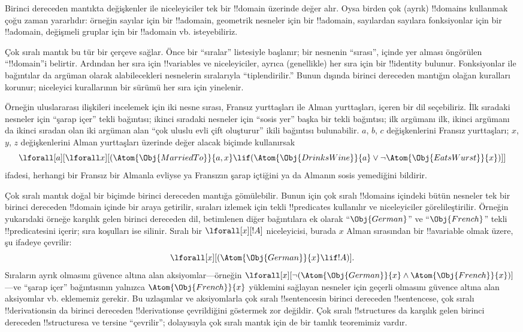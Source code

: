 \documentclass[../../../include/open-logic-section]{subfiles}
\begin{document}


Birinci dereceden mantıkta değişkenler ile niceleyiciler tek bir !!{domain}
üzerinde değer alır. Oysa birden çok (ayrık) !!{domain}s kullanmak çoğu zaman
yararlıdır: örneğin sayılar için bir !!a{domain}, geometrik nesneler için bir
!!a{domain}, sayılardan sayılara fonksiyonlar için bir !!a{domain}, değişmeli
gruplar için bir !!a{domain} vb. isteyebiliriz.

Çok sıralı mantık bu tür bir çerçeve sağlar. Önce bir ``sıralar'' listesiyle
başlanır; bir nesnenin ``sırası'', içinde yer alması öngörülen ``!!{domain}''i
belirtir. Ardından her sıra için !!{variable}s ve niceleyiciler, ayrıca
(genellikle) her sıra için bir !!{identity} bulunur. Fonksiyonlar ile
bağıntılar da argüman olarak alabilecekleri nesnelerin sıralarıyla
``tiplendirilir.'' Bunun dışında birinci dereceden mantığın olağan kuralları
korunur; niceleyici kurallarının bir sürümü her sıra için yinelenir.

Örneğin uluslararası ilişkileri incelemek için iki nesne sırası, Fransız
yurttaşları ile Alman yurttaşları, içeren bir dil seçebiliriz. İlk sıradaki
nesneler için ``şarap içer'' tekli bağıntısı; ikinci sıradaki nesneler için
``sosis yer'' başka bir tekli bağıntısı; ilk argümanı ilk, ikinci argümanı da
ikinci sıradan olan iki argüman alan ``çok uluslu evli çift oluşturur'' ikili
bağıntısı bulunabilir. $a$, $b$, $c$ değişkenlerini Fransız yurttaşları;
$x$, $y$, $z$ değişkenlerini Alman yurttaşları üzerinde değer alacak biçimde
kullanırsak
\[
\lforall[a][\lforall x][(\Atom{\Obj{MarriedTo}}{a,x} \lif
(\Atom{\Obj{DrinksWine}}{a} \lor \lnot \Atom{\Obj{EatsWurst}}{x})]]
\]
ifadesi, herhangi bir Fransız bir Almanla evliyse ya Fransızın şarap içtiğini
ya da Almanın sosis yemediğini bildirir.

Çok sıralı mantık doğal bir biçimde birinci dereceden mantığa gömülebilir.
Bunun için çok sıralı !!{domain}s içindeki bütün nesneler tek bir birinci
dereceden !!{domain} içinde bir araya getirilir, sıraları izlemek için tekli
!!{predicate}s kullanılır ve niceleyiciler görelileştirilir. Örneğin yukarıdaki
örneğe karşılık gelen birinci dereceden dil, betimlenen diğer bağıntılara ek
olarak ``$\Obj{German}$'' ve ``$\Obj{French}$'' tekli !!{predicate}s{}ini içerir;
sıra koşulları ise silinir. Sıralı bir $\lforall[x][!A]$ niceleyicisi, burada
$x$ Alman sırasından bir !!a{variable} olmak üzere, şu ifadeye çevrilir:
\[
\lforall[x][(\Atom{\Obj{German}}{x} \lif !A)].
\]
Sıraların ayrık olmasını güvence altına alan aksiyomlar---örneğin
$\lforall[x][\lnot (\Atom{\Obj{German}}{x} \land
  \Atom{\Obj{French}}{x})]$---ve ``şarap içer'' bağıntısının yalnızca
$\Atom{\Obj{French}}{x}$ yüklemini sağlayan nesneler için geçerli olmasını
güvence altına alan aksiyomlar vb. eklememiz gerekir. Bu uzlaşımlar ve
aksiyomlarla çok sıralı !!{sentence}s{}in birinci dereceden !!{sentence}s{}e,
çok sıralı !!{derivation}s{}in da birinci dereceden !!{derivation}s{}e çevrildiğini
göstermek zor değildir. Çok sıralı !!{structure}s da karşılık gelen birinci
dereceden !!{structure}s{}a ve tersine ``çevrilir''; dolayısıyla çok sıralı
mantık için de bir tamlık teoremimiz vardır.
\end{document}
